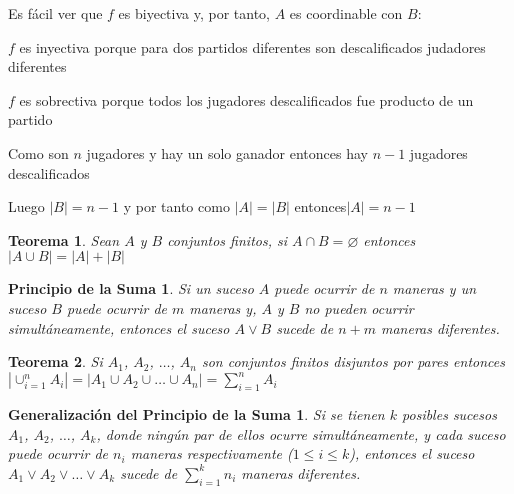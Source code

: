 \documentclass[a4paper,12pt]{report}
\newtheorem*{psm}{Principio de la Suma}
\newtheorem*{gpsm}{Generalización del Principio de la Suma}
\newtheorem*{pie}{Principio de Inclusión - Exclusión}
\newtheorem*{teo}{Teorema}
\begin{document}
 Es fácil ver que $f$ es biyectiva y, por tanto, $A$ es coordinable con $B$:
 
 $f$ es inyectiva porque para dos partidos diferentes son descalificados judadores diferentes
 
 $f$ es sobrectiva porque todos los jugadores descalificados fue producto de un partido
 
 Como son $n$ jugadores y hay un solo ganador entonces hay $n-1$ jugadores descalificados
 
 Luego $|B|=n-1$ y por tanto como $|A|=|B|$ entonces$|A|=n-1$

 
 \begin{teo}
  Sean $A$ y $B$ conjuntos finitos, si $A\cap B = \varnothing$ entonces \\$|A\cup B|=|A|+|B|$
 \end{teo}
% 
% 
% 
% 
 

\begin{psm}
 Si un suceso $A$ puede ocurrir de $n$ maneras y un suceso $B$ puede ocurrir de $m$ maneras y, $A$ y $B$ no pueden ocurrir simultáneamente, entonces el suceso $A \lor  B$ sucede de $n + m$ maneras diferentes.
\end{psm}

\begin{teo}
 Si $A_1$, $A_2$, $\dots$, $A_n$ son conjuntos finitos disjuntos por pares entonces
 $|\cup^n_{i=1}A_i|=|A_1\cup A_2\cup \dots \cup A_n|=\sum^n_{i=1}A_i$
\end{teo}

\begin{gpsm}
 Si se tienen $k$ posibles sucesos $A_1$, $A_2$, $\dots$, $A_k$, donde ning\'un par de ellos ocurre simultáneamente, y cada suceso puede ocurrir de $n_i$ maneras respectivamente ($1\leq i \leq k$), entonces el suceso $A_1\vee A_2\vee \dots \vee A_k$ sucede de $\sum^k_{i=1}n_i$ maneras diferentes.
\end{gpsm}
\end{document}
